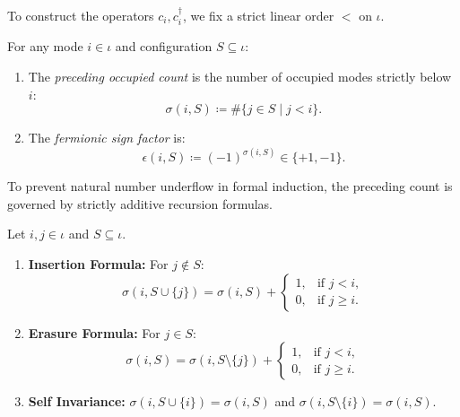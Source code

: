 To construct the operators $c_i, c_i^\dagger$, we fix a strict linear order $<$ on $\iota$.

\begin{definition}
For any mode $i \in \iota$ and configuration $S \subseteq \iota$:
\begin{enumerate}
    \item The \emph{preceding occupied count} is the number of occupied modes strictly below $i$:
    \begin{equation}
    \sigma(i, S) \coloneqq \#\{ j \in S \mid j < i \}.
    \end{equation}
    \item The \emph{fermionic sign factor} is:
    \begin{equation}
    \epsilon(i, S) \coloneqq (-1)^{\sigma(i, S)} \in \{+1, -1\}.
    \end{equation}
\end{enumerate}
\end{definition}

To prevent natural number underflow in formal induction, the preceding count is governed by strictly additive recursion formulas.

\begin{lemma}
\label{lem:additive_count}
Let $i, j \in \iota$ and $S \subseteq \iota$.
\begin{enumerate}
    \item \textbf{Insertion Formula:} For $j \notin S$:
    \begin{equation}
    \sigma(i, S \cup \{j\}) = \sigma(i, S) + \begin{cases} 1, & \text{if } j < i, \\ 0, & \text{if } j \ge i. \end{cases}
    \end{equation}
    \item \textbf{Erasure Formula:} For $j \in S$:
    \begin{equation}
    \sigma(i, S) = \sigma(i, S \setminus \{j\}) + \begin{cases} 1, & \text{if } j < i, \\ 0, & \text{if } j \ge i. \end{cases}
    \end{equation}
    \item \textbf{Self Invariance:} $\sigma(i, S \cup \{i\}) = \sigma(i, S)$ and $\sigma(i, S \setminus \{i\}) = \sigma(i, S)$.
\end{enumerate}
\end{lemma}


